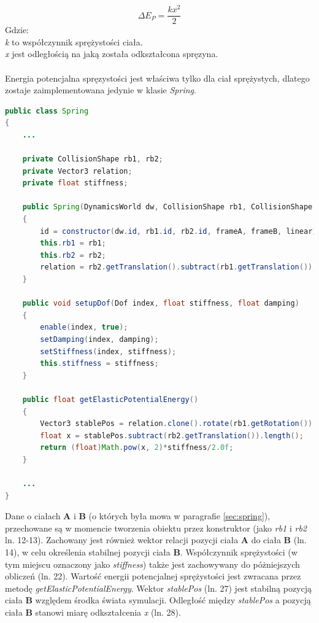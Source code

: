 \begin{equation}
\Delta E_{P} = \frac{kx^{2}}{2}
\end{equation}
Gdzie:\\
\emph{k} to współczynnik sprężystości ciała.\\
\emph{x} jest odległością na jaką została odkształcona spręzyna.\\
 \\
Energia potencjalna spręzystości jest właściwa tylko dla ciał sprężystych,
dlatego zostaje zaimplementowana jedynie w klasie \emph{Spring}.

\begin{lstlisting}[language=Java,
caption=Obliczanie energii potencjalnej spręzystości,label=lis:epelastic]
public class Spring
{
	...
	
	private CollisionShape rb1, rb2;
	private Vector3 relation;
	private float stiffness;
	
	public Spring(DynamicsWorld dw, CollisionShape rb1, CollisionShape rb2, Vector3 frameA, Vector3 frameB, boolean linear)
	{
		id = constructor(dw.id, rb1.id, rb2.id, frameA, frameB, linear);
		this.rb1 = rb1;
		this.rb2 = rb2;
		relation = rb2.getTranslation().subtract(rb1.getTranslation());
	}
	
	public void setupDof(Dof index, float stiffness, float damping)
	{
		enable(index, true);
		setDamping(index, damping);
		setStiffness(index, stiffness);
		this.stiffness = stiffness;
	}
	
	public float getElasticPotentialEnergy()
	{
		Vector3 stablePos = relation.clone().rotate(rb1.getRotation()).add(rb1.getTranslation());
		float x = stablePos.subtract(rb2.getTranslation()).length();
		return (float)Math.pow(x, 2)*stiffness/2.0f;
	}
	
	...
}
\end{lstlisting}
Dane o ciałach \textbf{A} i \textbf{B} (o których była mowa w paragrafie
\ref{sec:spring}), przechowane są w momencie tworzenia obiektu przez konstruktor
(jako \emph{rb1} i \emph{rb2} ln. 12-13). Zachowany jest również wektor relacji
pozycji ciała \textbf{A} do ciała \textbf{B} (ln. 14), w celu określenia
stabilnej pozycji ciała \textbf{B}. Współczynnik sprężystości (w tym miejscu
oznaczony jako \emph{stiffness}) także jest zachowywany do póżniejszych obliczeń
(ln. 22). Wartość energii potencjalnej sprężystości jest zwracana przez metodę
\emph{getElasticPotentialEnergy}. Wektor \emph{stablePos} (ln. 27) jest stabilną
pozycją ciała \textbf{B} względem środka świata symulacji. Odległość między
\emph{stablePos} a pozycją ciała \textbf{B} stanowi miarę odkształcenia
\emph{x} (ln. 28).

